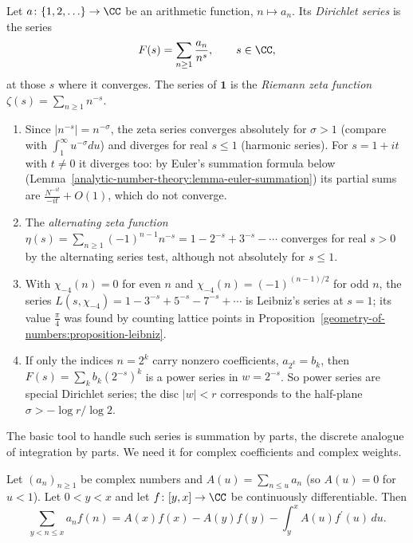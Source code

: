 \begin{definition}\label{analytic-number-theory:definition-dirichlet-series}
Let $a \colon \{1, 2, \ldots\} \to \CC$ be an arithmetic function, $n \mapsto a_n$. Its \emph{Dirichlet series} is the series
\[
F(s) = \sum_{n \geq 1}\frac{a_n}{n^s}, \qquad s \in \CC,
\]
at those $s$ where it converges. The series of $\mathbf{1}$ is the \emph{Riemann zeta function} $\zeta(s) = \sum_{n \geq 1}n^{-s}$.
\end{definition}

\begin{example}\label{analytic-number-theory:example-dirichlet-series}
\begin{enumerate}
\item Since $|n^{-s}| = n^{-\sigma}$, the zeta series converges absolutely for $\sigma > 1$ (compare with $\int_1^\infty u^{-\sigma}du$) and diverges for real $s \leq 1$ (harmonic series). For
$s = 1 + it$ with $t \neq 0$ it diverges too: by Euler's summation formula below (Lemma~\ref{analytic-number-theory:lemma-euler-summation}) its partial sums are
$\frac{N^{-it}}{-it} + O(1)$, which do not converge.
\item The \emph{alternating zeta function} $\eta(s) = \sum_{n \geq 1}(-1)^{n-1}n^{-s} = 1 - 2^{-s} + 3^{-s} - \cdots$ converges for real $s > 0$ by the alternating series test, although not
absolutely for $s \leq 1$.
\item With $\chi_{-4}(n) = 0$ for even $n$ and $\chi_{-4}(n) = (-1)^{(n-1)/2}$ for odd $n$, the series $L(s, \chi_{-4}) = 1 - 3^{-s} + 5^{-s} - 7^{-s} + \cdots$ is Leibniz's series at $s = 1$;
its value $\frac\pi4$ was found by counting lattice points in Proposition~\ref{geometry-of-numbers:proposition-leibniz}.
\item If only the indices $n = 2^k$ carry nonzero coefficients, $a_{2^k} = b_k$, then $F(s) = \sum_kb_k(2^{-s})^k$ is a power series in $w = 2^{-s}$. So power series are special Dirichlet series;
the disc $|w| < r$ corresponds to the half-plane $\sigma > -\log r/\log 2$.
\end{enumerate}
\end{example}

The basic tool to handle such series is summation by parts, the discrete analogue of integration by parts. We need it for complex coefficients and complex weights.

\begin{lemma}\label{analytic-number-theory:lemma-partial-summation}
Let $(a_n)_{n \geq 1}$ be complex numbers and $A(u) = \sum_{n \leq u}a_n$ (so $A(u) = 0$ for $u < 1$). Let $0 < y < x$ and let $f \colon [y, x] \to \CC$ be continuously differentiable. Then
\[
\sum_{y < n \leq x}a_nf(n) = A(x)f(x) - A(y)f(y) - \int_y^xA(u)f^{\prime}(u)\,du.
\]
\end{lemma}

